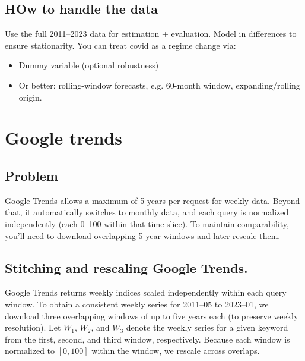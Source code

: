 \documentclass{article}
\begin{document}
\subsection{HOw to handle the data}
Use the full 2011–2023 data for estimation + evaluation.
Model in differences to ensure stationarity.
You can treat covid as a regime change via:
\begin{itemize}
    \item Dummy variable (optional robustness)
    \item Or better: rolling-window forecasts, e.g. 60-month window, expanding/rolling origin.
\end{itemize}



\section{Google trends}

\subsection{Problem}
Google Trends allows a maximum of 5 years per request for weekly data.
Beyond that, it automatically switches to monthly data, and each query is normalized independently (each 0–100 within that time slice).
To maintain comparability, you’ll need to download overlapping 5-year windows and later rescale them.

\subsection{Stitching and rescaling Google Trends.}
Google Trends returns weekly indices scaled independently within each query window.
To obtain a consistent weekly series for 2011--05 to 2023--01, we download three overlapping
windows of up to five years each (to preserve weekly resolution). Let $W_1$, $W_2$, and $W_3$
denote the weekly series for a given keyword from the first, second, and third window, respectively.
Because each window is normalized to $[0,100]$ within the window, we rescale across overlaps.
\end{document}
